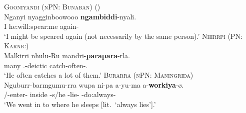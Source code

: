 \documentclass[12pt,egregdoesnotlikesansseriftitles]{scrartcl}
\begin{document}
\begin{exe}
  \ex\label{ex:gniagain} \textsc{Gooniyandi (nPN: Bunaban)} (\citealt[462]{mcgregor90})\\
  \gll Nganyi nyagginboowooo \textbf{ngambiddi}-nyali.\\
  I he:will:spear:me again-\Rep\\
  \glt `I might be speared again (not necessarily by the same person).'
  \ex\label{ex:oftsuff} \textsc{Nhirrpi (PN: Karnic)}\hfill {}\\
  \gll Malkirri nhulu-Ru mandri-\textbf{parapara}-rla.\\
  many \Tsg.\Erg-deictic catch-often-\Prs.\Prog\\
  `He often catches a lot of them.'
  \ex\label{ex:valways} \textsc{Burarra (nPN: Maningrida)}\hfill {}\\
  \gll Nguburr-barmgumu-rra wupa ni-pa a-yu-ma a-\textbf{workiya}-ø.\\
  \First/\Second\Aug-enter-\Pc{} inside \Third\Min-s/he  \Third\Min-lie-\Ctp{} \Third\Min-do:always-\Ctp\\
  \glt `We went in to where he sleeps [lit.\ `always lies'].'
\end{exe}
\end{document}
